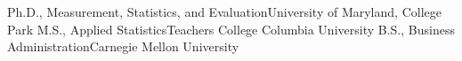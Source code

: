 %
%
%

\begin{scholarship}
	{Ph.D., Measurement, Statistics, and Evaluation}{University of Maryland, College Park}
	{M.S., Applied Statistics}{Teachers College Columbia University}
	{B.S., Business Administration}{Carnegie Mellon University}

\end{scholarship}